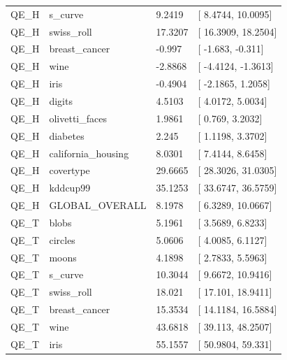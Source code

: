 \documentclass[
]{article}
\providecommand{\DIFadd}[1]{{\protect\color{blue} #1}} %
\begin{document}
{\begin{longtable}[]{@{}llll@{}}
\DIFadd{QE\_H }& \DIFadd{s\_curve }& \DIFadd{9.2419 }& {[}\DIFadd{8.4744, 10.0095}{]} \\
\DIFadd{QE\_H }& \DIFadd{swiss\_roll }& \DIFadd{17.3207 }& {[}\DIFadd{16.3909, 18.2504}{]} \\
\DIFadd{QE\_H }& \DIFadd{breast\_cancer }& \DIFadd{-0.997 }& {[}\DIFadd{-1.683, -0.311}{]} \\
\DIFadd{QE\_H }& \DIFadd{wine }& \DIFadd{-2.8868 }& {[}\DIFadd{-4.4124, -1.3613}{]} \\
\DIFadd{QE\_H }& \DIFadd{iris }& \DIFadd{-0.4904 }& {[}\DIFadd{-2.1865, 1.2058}{]} \\
\DIFadd{QE\_H }& \DIFadd{digits }& \DIFadd{4.5103 }& {[}\DIFadd{4.0172, 5.0034}{]} \\
\DIFadd{QE\_H }& \DIFadd{olivetti\_faces }& \DIFadd{1.9861 }& {[}\DIFadd{0.769, 3.2032}{]} \\
\DIFadd{QE\_H }& \DIFadd{diabetes }& \DIFadd{2.245 }& {[}\DIFadd{1.1198, 3.3702}{]} \\
\DIFadd{QE\_H }& \DIFadd{california\_housing }& \DIFadd{8.0301 }& {[}\DIFadd{7.4144, 8.6458}{]} \\
\DIFadd{QE\_H }& \DIFadd{covertype }& \DIFadd{29.6665 }& {[}\DIFadd{28.3026, 31.0305}{]} \\
\DIFadd{QE\_H }& \DIFadd{kddcup99 }& \DIFadd{35.1253 }& {[}\DIFadd{33.6747, 36.5759}{]} \\
\DIFadd{QE\_H }& \DIFadd{GLOBAL\_OVERALL }& \DIFadd{8.1978 }& {[}\DIFadd{6.3289, 10.0667}{]} \\
\DIFadd{QE\_T }& \DIFadd{blobs }& \DIFadd{5.1961 }& {[}\DIFadd{3.5689, 6.8233}{]} \\
\DIFadd{QE\_T }& \DIFadd{circles }& \DIFadd{5.0606 }& {[}\DIFadd{4.0085, 6.1127}{]} \\
\DIFadd{QE\_T }& \DIFadd{moons }& \DIFadd{4.1898 }& {[}\DIFadd{2.7833, 5.5963}{]} \\
\DIFadd{QE\_T }& \DIFadd{s\_curve }& \DIFadd{10.3044 }& {[}\DIFadd{9.6672, 10.9416}{]} \\
\DIFadd{QE\_T }& \DIFadd{swiss\_roll }& \DIFadd{18.021 }& {[}\DIFadd{17.101, 18.9411}{]} \\
\DIFadd{QE\_T }& \DIFadd{breast\_cancer }& \DIFadd{15.3534 }& {[}\DIFadd{14.1184, 16.5884}{]} \\
\DIFadd{QE\_T }& \DIFadd{wine }& \DIFadd{43.6818 }& {[}\DIFadd{39.113, 48.2507}{]} \\
\DIFadd{QE\_T }& \DIFadd{iris }& \DIFadd{55.1557 }& {[}\DIFadd{50.9804, 59.331}{]} \\

\end{longtable}}
\end{document}

